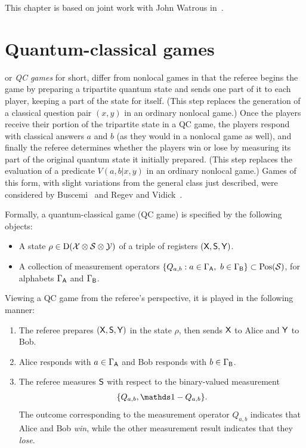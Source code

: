 This chapter is based on joint work with John Watrous in~\cite{Russo2016}.

\minitoc

\section{Quantum-classical games}  \label{sec:quantum-classical-games}

 or \emph{QC games} for short, differ from nonlocal games in that the referee begins the game by preparing a tripartite quantum state and sends one part of it to each player, keeping a part of the state for itself. (This step replaces the generation of a classical question pair $(x,y)$ in an ordinary nonlocal game.) Once the players receive their portion of the tripartite state in a QC game, the players respond with classical answers $a$ and $b$ (as they would in a nonlocal game as well), and finally the referee determines whether the players win or lose by measuring its part of the original quantum state it initially prepared. (This step replaces the evaluation of a predicate $V(a,b|x,y)$ in an ordinary nonlocal game.) Games of this form, with slight variations from the general class just described, were considered by Buscemi~\cite{Buscemi2012} and Regev and Vidick~\cite{Regev2013}. 

Formally, a quantum-classical game (QC game) is specified by the following objects:
\begin{itemize}
	\item A state $\rho \in \mathrm{D}(\mathcal{X} \otimes \mathcal{S} \otimes \mathcal{Y})$ of a triple of registers $(\mathsf{X},\mathsf{S},\mathsf{Y})$.
	\item A collection of measurement operators $\{ Q_{a,b} : a \in \Gamma_{\mathsf{A}}, \ b \in \Gamma_{\mathsf{B}} \} \subset \mathrm{Pos}(\mathcal{S})$, for alphabets $\Gamma_{\mathsf{A}}$ and $\Gamma_{\mathsf{B}}$.  
\end{itemize}
Viewing a QC game from the referee's perspective, it is played in the following manner:
\begin{enumerate}
	\item The referee prepares $(\mathsf{X},\mathsf{S},\mathsf{Y})$ in the state $\rho$, then sends $\mathsf{X}$ to Alice and $\mathsf{Y}$ to Bob. 
	\item Alice responds with $a \in \Gamma_{\mathsf{A}}$ and Bob responds with $b \in \Gamma_{\mathsf{B}}$. 
	\item The referee measures $\mathsf{S}$ with respect to the binary-valued measurement 
		\begin{align}
			\{Q_{a,b}, \I - Q_{a,b}\}.
		\end{align} 
	The outcome corresponding to the measurement operator $Q_{a,b}$ indicates that Alice and Bob \emph{win}, while the other measurement result indicates that they \emph{lose}. 
\end{enumerate}

